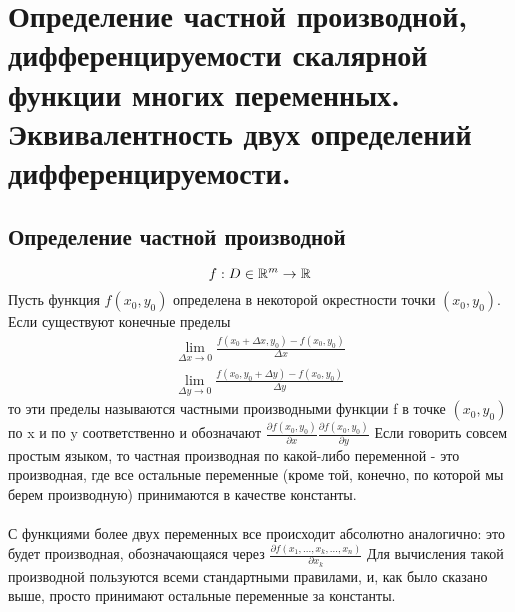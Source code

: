 \section{Определение частной производной, дифференцируемости скалярной функции многих переменных.
Эквивалентность двух определений дифференцируемости.}

\subsection{Определение частной производной}
$$
f: D\in \mathbb{R}^m \rightarrow \mathbb{R}
$$
Пусть функция $f(x_0, y_0)$ определена в некоторой окрестности точки $(x_0, y_0)$. Если существуют конечные пределы 
\begin{gather*}
\lim_{\Delta x \rightarrow 0}{\frac{f(x_0 + \Delta x, y_0) - f(x_0, y_0)}{\Delta x}}
\\
\lim_{\Delta y \rightarrow 0}{\frac{f(x_0, y_0 + \Delta y) - f(x_0, y_0)}{\Delta y}}
\end{gather*}
то эти пределы называются частными производными функции f в точке $(x_0, y_0)$ по x и по y соответственно и обозначают $\frac{\partial f(x_0, y_0)}{\partial x}  \frac{\partial f(x_0, y_0)}{\partial y}$
Если говорить совсем простым языком, то частная производная по какой-либо переменной - это производная, где все остальные переменные (кроме той, конечно, по которой мы берем производную) принимаются в качестве константы.
\\
\\
С функциями более двух переменных все происходит абсолютно аналогично: это будет производная, обозначающаяся через $\frac{\partial f(x_1,...,x_k,...,x_n)}{\partial x_k}$
Для вычисления такой производной пользуются всеми стандартными правилами, и, как было сказано выше, просто принимают остальные переменные за константы.

